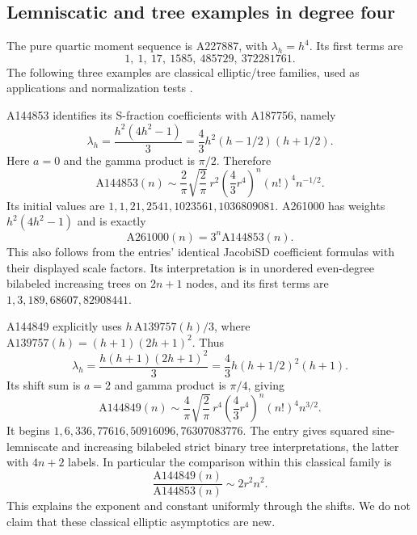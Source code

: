 \documentclass[11pt,letterpaper]{article}
\numberwithin{equation}{section}
\theoremstyle{remark}\newtheorem{remark}[theorem]{Remark}
\begin{document}
\subsection{Lemniscatic and tree examples in degree four}
The pure quartic moment sequence is A227887, with $\lambda_h=h^4$. Its first terms are
\[
 1,\ 1,\ 17,\ 1585,\ 485729,\ 372281761.
\]
The following three examples are classical elliptic/tree families, used as applications and normalization tests \cite{oeisquartic}.

A144853 identifies its S-fraction coefficients with A187756, namely
\[
 \lambda_h=\frac{h^2(4h^2-1)}3
 =\frac43h^2(h-1/2)(h+1/2).
\]
Here $a=0$ and the gamma product is $\pi/2$. Therefore
\begin{equation}\label{pwd:hm:eq:A144853}
 \mathrm{A144853}(n)\sim\frac2\pi\sqrt{\frac2\pi}\,r^2
 \left(\frac43r^4\right)^n(n!)^4n^{-1/2}.
\end{equation}
Its initial values are $1,1,21,2541,1023561,1036809081$. A261000 has weights $h^2(4h^2-1)$ and is exactly
\begin{equation}\label{pwd:hm:eq:A261000}
 \mathrm{A261000}(n)=3^n\mathrm{A144853}(n).
\end{equation}
This also follows from the entries' identical JacobiSD coefficient formulas with their displayed scale factors. Its interpretation is in unordered even-degree bilabeled increasing trees on $2n+1$ nodes, and its first terms are $1,3,189,68607,82908441$.

A144849 explicitly uses $h\,\mathrm{A139757}(h)/3$, where
$\mathrm{A139757}(h)=(h+1)(2h+1)^2$. Thus
\[
 \lambda_h=\frac{h(h+1)(2h+1)^2}{3}
 =\frac43h(h+1/2)^2(h+1).
\]
Its shift sum is $a=2$ and gamma product is $\pi/4$, giving
\begin{equation}\label{pwd:hm:eq:A144849}
 \mathrm{A144849}(n)\sim\frac4\pi\sqrt{\frac2\pi}\,r^4
 \left(\frac43r^4\right)^n(n!)^4n^{3/2}.
\end{equation}
It begins $1,6,336,77616,50916096,76307083776$. The entry gives squared sine-lemniscate and increasing bilabeled strict binary tree interpretations, the latter with $4n+2$ labels. In particular the comparison within this classical family is
\begin{equation}\label{pwd:hm:eq:tree-ratio}
 \frac{\mathrm{A144849}(n)}{\mathrm{A144853}(n)}\sim2r^2n^2.
\end{equation}
This explains the exponent and constant uniformly through the shifts. We do not claim that these classical elliptic asymptotics are new.
\end{document}

